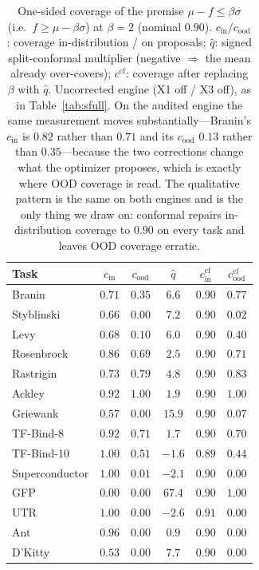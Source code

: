 \documentclass[letterpaper]{article}
\theoremstyle{plain}
\begin{document}
\begin{table}[t]\centering
\caption{One-sided coverage of the premise $\mu{-}f\le\beta\sigma$ (i.e.\ $f\ge\mu-\beta\sigma$) at $\beta{=}2$ (nominal $0.90$). $c_{\text{in}}/c_{\text{ood}}$: coverage in-distribution / on proposals; $\hat q$: signed split-conformal multiplier (negative $\Rightarrow$ the mean already over-covers); $c^{\text{cf}}$: coverage after replacing $\beta$ with $\hat q$. Uncorrected engine (X1 off / X3 off), as in Table~\ref{tab:sfull}. On the audited engine the same measurement moves substantially---Branin's $c_{\text{in}}$ is $0.82$ rather than $0.71$ and its $c_{\text{ood}}$ $0.13$ rather than $0.35$---because the two corrections change what the optimizer proposes, which is exactly where OOD coverage is read. The qualitative pattern is the same on both engines and is the only thing we draw on: conformal repairs in-distribution coverage to $0.90$ on every task and leaves OOD coverage erratic.}
\label{tab:cov}
\setlength{\tabcolsep}{4pt}\small
\begin{tabular}{lccccc}
\toprule
Task & $c_{\text{in}}$ & $c_{\text{ood}}$ & $\hat q$ & $c^{\text{cf}}_{\text{in}}$ & $c^{\text{cf}}_{\text{ood}}$ \\
\midrule
Branin      & $0.71$ & $0.35$ & $6.6$  & $0.90$ & $0.77$ \\
Styblinski  & $0.66$ & $0.00$ & $7.2$  & $0.90$ & $0.02$ \\
Levy        & $0.68$ & $0.10$ & $6.0$  & $0.90$ & $0.40$ \\
Rosenbrock  & $0.86$ & $0.69$ & $2.5$  & $0.90$ & $0.71$ \\
Rastrigin   & $0.73$ & $0.79$ & $4.8$  & $0.90$ & $0.83$ \\
Ackley      & $0.92$ & $1.00$ & $1.9$  & $0.90$ & $1.00$ \\
Griewank    & $0.57$ & $0.00$ & $15.9$ & $0.90$ & $0.07$ \\
\midrule
TF-Bind-8      & $0.92$ & $0.71$ & $1.7$  & $0.90$ & $0.70$ \\
TF-Bind-10     & $1.00$ & $0.51$ & $-1.6$ & $0.89$ & $0.44$ \\
Superconductor & $1.00$ & $0.01$ & $-2.1$ & $0.90$ & $0.00$ \\
GFP            & $0.00$ & $0.00$ & $67.4$ & $0.90$ & $1.00$ \\
UTR            & $1.00$ & $0.00$ & $-2.6$ & $0.91$ & $0.00$ \\
Ant            & $0.96$ & $0.00$ & $0.9$  & $0.90$ & $0.00$ \\
D'Kitty        & $0.53$ & $0.00$ & $7.7$  & $0.90$ & $0.00$ \\
\bottomrule
\end{tabular}
\end{table}
\end{document}
